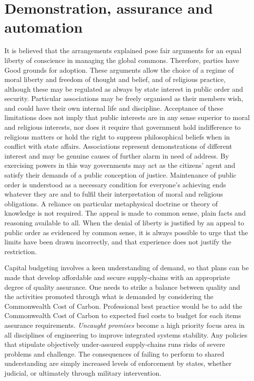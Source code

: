 \documentclass[11pt, oneside]{book}   	%
\begin{document}
\section{Demonstration, assurance and automation}
It is believed that the arrangements explained pose fair arguments for an equal liberty of conscience in managing the global commons.
Therefore, parties have Good grounds for adoption.
These arguments allow the choice of a regime of moral liberty and freedom of thought and belief, and of religious practice, although these may be regulated as always by state interest in public order and security.
Particular associations may be freely organised as their members wish, and could have their own internal life and discipline.
Acceptance of these limitations does not imply that public interests are in any sense superior to moral and religious interests, nor does it require that government hold indifference to religious matters or hold the right to suppress philosophical beliefs when in conflict with state affairs.
Associations represent demonstrations of different interest and may be genuine causes of further alarm in need of address.
By exercising powers in this way governments may act as the citizens' agent and satisfy their demands of a public conception of justice.
Maintenance of public order is understood as a necessary condition for everyone's achieving ends whatever they are and to fulfil their interpretation of moral and religious obligations.
A reliance on particular metaphysical doctrine or theory of knowledge is not required.
The appeal is made to common sense, plain facts and reasoning available to all.
When the denial of liberty is justified by an appeal to public order as evidenced by common sense, it is always possible to urge that the limits have been drawn incorrectly, and that experience does not justify the restriction.\

Capital budgeting involves a keen understanding of demand, so that plans can be made that develop affordable and secure supply-chains with an appropriate degree of quality assurance.
One needs to strike a balance between quality and the activities promoted through what is demanded by considering the Commonwealth Cost of Carbon.
Professional best practice would be to add the Commonwealth Cost of Carbon to expected fuel costs to budget for each items assurance requirements.
\emph{Uncaught promises} become a high priority focus area in all disciplines of engineering to improve integrated systems stability.
Any policies that stipulate objectively under-assured supply-chains runs risks of severe problems and challenge.
The consequences of failing to perform to shared understanding are simply increased levels of enforcement by states, whether judicial, or ultimately through military intervention.\
\end{document}
